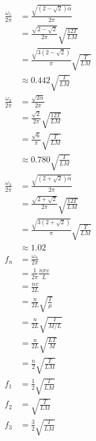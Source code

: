 \documentclass{article}
\begin{document}
\begin{enumerate}
        \begin{align*}
          \frac{\omega_1}{2 \pi} & = \frac{\sqrt{(2 - \sqrt{2}) \alpha}}{2 \pi}                \\
                                 & = \frac{\sqrt{2 - \sqrt{2}}}{2 \pi} \sqrt{\frac{12 T}{L M}} \\
                                 & = \frac{\sqrt{3 (2 - \sqrt{2})}}{\pi} \sqrt{\frac{T}{L M}}  \\
                                 & \approx 0.442 \sqrt{\frac{T}{L M}}                          \\
          \frac{\omega_2}{2 \pi} & = \frac{\sqrt{2 \alpha}}{2 \pi}                             \\
                                 & = \frac{\sqrt{2}}{2 \pi} \sqrt{\frac{12 T}{L M}}            \\
                                 & = \frac{\sqrt{6}}{\pi} \sqrt{\frac{T}{L M}}                 \\
                                 & \approx 0.780 \sqrt{\frac{T}{L M}}                          \\
          \frac{\omega_3}{2 \pi} & = \frac{\sqrt{(2 + \sqrt{2}) \alpha}}{2 \pi}                \\
                                 & = \frac{\sqrt{2 + \sqrt{2}}}{2 \pi} \sqrt{\frac{12 T}{L M}} \\
                                 & = \frac{\sqrt{3 (2 + \sqrt{2})}}{\pi} \sqrt{\frac{T}{L M}}  \\
                                 & \approx 1.02                                                \\
          f_n                    & = \frac{\omega_n}{2 \pi}                                    \\
                                 & = \frac{1}{2 \pi} \frac{n \pi v}{L}                         \\
                                 & = \frac{n v}{2 L}                                           \\
                                 & = \frac{n}{2 L} \sqrt{\frac{T}{\mu}}                        \\
                                 & = \frac{n}{2 L} \sqrt{\frac{T}{M / L}}                      \\
                                 & = \frac{n}{2 L} \sqrt{\frac{L T}{M}}                        \\
                                 & = \frac{n}{2} \sqrt{\frac{T}{L M}}                          \\
          f_1                    & = \frac{1}{2} \sqrt{\frac{T}{L M}}                          \\
          f_2                    & = \sqrt{\frac{T}{L M}}                                      \\
          f_3                    & = \frac{3}{2} \sqrt{\frac{T}{L M}}
        \end{align*}
\end{enumerate}
\end{document}
